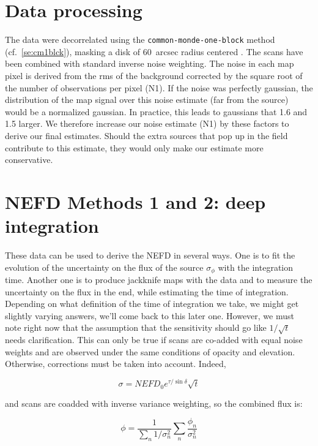 \section{Data processing}

The data were decorrelated using the {\tt common-monde-one-block} method
(cf.~\ref{se:cm1blck}), masking a disk of 60~arcsec radius centered \hls.  The
scans have been combined with standard inverse noise weighting. The noise in
each map pixel is derived from the rms of the background corrected by the square
root of the number of observations per pixel (N1). If the noise was perfectly
gaussian, the distribution of the map signal over this noise estimate (far from
the source) would be a normalized gaussian. In practice, this leads to gaussians
that 1.6 and 1.5 larger. We therefore increase our noise estimate (N1) by these
factors to derive our final estimates. Should the extra sources that pop up in
the field contribute to this estimate, they would only make our estimate more
conservative.

\section{NEFD Methods 1 and 2: deep integration}


These data can be used to derive the NEFD in several ways. One is to fit the
evolution of the uncertainty on the flux of the source $\sigma_\phi$ with the
integration time. Another one is to produce jackknife maps with the data and to
measure the uncertainty on the flux in the end, while estimating the time of
integration. Depending on what definition of the time of integration we take, we
might get slightly varying answers, we'll come back to this later one. However,
we must note right now that the assumption that the sensitivity should go like
$1/\sqrt{t}$ needs clarification. This can only be true if scans are co-added
with equal noise weights and are observed under the same conditions of opacity
and elevation. Otherwise, corrections must be taken into account. Indeed, 

\begin{equation}
\sigma = NEFD_0e^{\tau/\sin\delta}\sqrt{t}
\label{eq:sigma_nefd}
\end{equation}

and scans are coadded with inverse variance weighting, so the combined flux is:

\begin{equation}
\phi = \frac{1}{\sum_n 1/\sigma_n^2}\sum_n\frac{\phi_n}{\sigma_n^2}
\end{equation}

